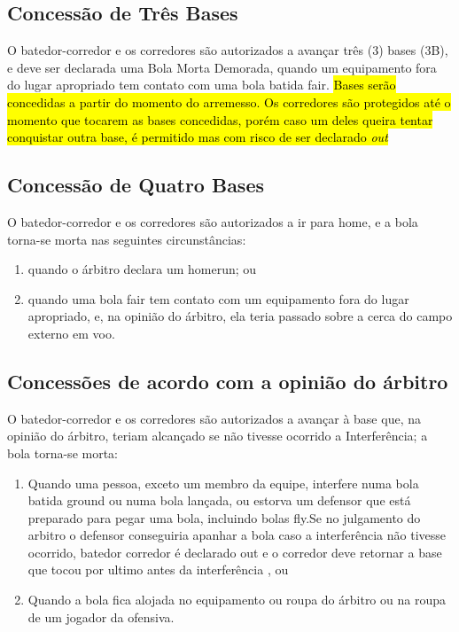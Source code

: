 \begin{enumerate}[label=\roman*.]
	\subsection{Concessão de Três Bases}

	O batedor-corredor e os corredores são autorizados a avançar três (3) bases (\gls{3B}), e deve ser declarada uma Bola Morta Demorada, quando um equipamento fora do lugar apropriado tem contato com uma bola batida \gls{fair}. \hl{Bases ser\~ao concedidas a partir do momento do arremesso. Os corredores s\~ao protegidos at\'e o momento que tocarem as bases concedidas, por\'em caso um deles queira tentar conquistar outra base, \'e permitido mas com risco de ser declarado \textit{out}}

	\subsection{Concessão de Quatro Bases}

	O batedor-corredor e os corredores são autorizados a ir para \gls{home}, e a bola torna-se morta nas seguintes circunstâncias:

	\begin{enumerate}[label=\roman*.]
		\item quando o árbitro declara um \gls{homerun}; ou
		\item quando uma bola \gls{fair} tem contato com um equipamento fora do lugar apropriado, e, na opinião do árbitro, ela teria passado sobre a cerca do campo externo em voo.
	\end{enumerate}

	\subsection{Concessões de acordo com a opinião do árbitro}

	O batedor-corredor e os corredores são autorizados a avançar à base que, na opinião do árbitro, teriam alcançado se não tivesse ocorrido a Interferência; a bola torna-se morta:

	\begin{enumerate}[label=\roman*.]
		\item Quando uma pessoa, exceto um membro da equipe, interfere numa bola batida \gls{ground} ou numa bola lançada, ou estorva um defensor que está preparado para pegar uma bola, incluindo bolas \gls{fly}.Se no julgamento do arbitro o defensor conseguiria apanhar a bola caso a interferência não tivesse ocorrido, batedor corredor é declarado out e o corredor deve retornar a base que tocou por ultimo antes da interferência , ou
		\item  Quando a bola fica alojada no equipamento ou roupa do árbitro ou na roupa de um jogador da ofensiva.
	\end{enumerate}
\end{enumerate}


